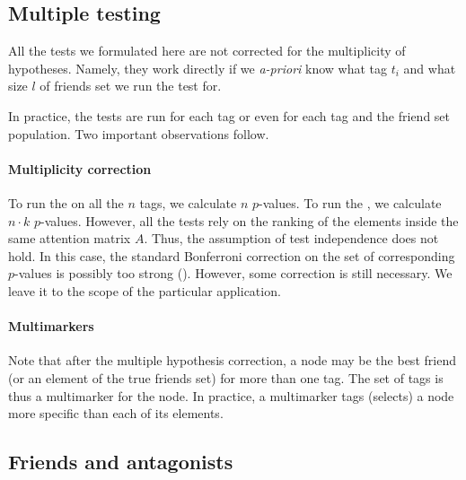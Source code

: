 \documentclass{llncs}
\begin{document}


\subsection{Multiple testing}
\label{sec:multimurkers}

All the tests we formulated here are not corrected for the multiplicity of hypotheses. Namely, they work directly if we \textit{a-priori} know what tag $t_i$ and what size $l$ of friends set we run the test for. 

In practice, the tests are run for each tag or even for each tag and the friend set population. Two important observations follow.

\paragraph*{Multiplicity correction} 
To run the  on all the $n$ tags, we 
calculate $n$ $p$-values. To run the , we calculate $n \cdot k$ $p$-values. However, all the tests rely on the ranking of the elements inside the same attention matrix $A$. Thus, the assumption of test independence does not hold. In this case, the standard Bonferroni correction on the set of corresponding $p$-values is possibly too strong (\cite{cabin2000bonferroni}). However, some correction is still necessary. We leave it to the scope of the particular application.

\paragraph*{Multimarkers} Note that after the multiple hypothesis correction, a node may be the best friend (or an element of the true friends set) for more than one tag. The set of tags is thus a multimarker for the node. In practice, a multimarker tags (selects) a node more specific than each of its elements.

\subsection{Friends and antagonists}
\end{document}
